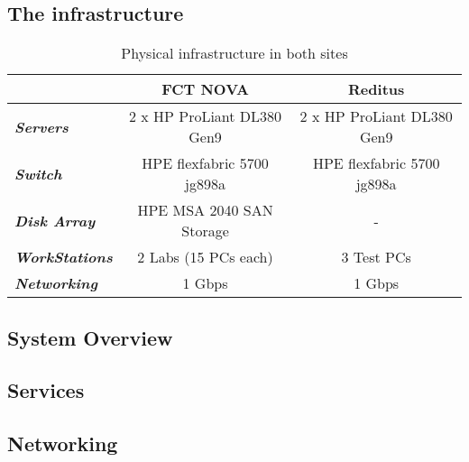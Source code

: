 \subsection{The infrastructure}
\label{sub:infrastructure}


\begin{table}[htpb]
\centering
\begin{tabular}{lcc}
\hline
                               & \textbf{FCT NOVA}          & \textbf{Reditus}           \\ \hline
\textit{\textbf{Servers}}      & 2 x HP ProLiant DL380 Gen9 & 2 x HP ProLiant DL380 Gen9 \\
\textit{\textbf{Switch}}       & HPE flexfabric 5700 jg898a & HPE flexfabric 5700 jg898a \\
\textit{\textbf{Disk Array}}   & HPE MSA 2040 SAN Storage   & -                          \\
\textit{\textbf{WorkStations}} & 2 Labs (15 PCs each)       & 3 Test PCs                 \\
\textit{\textbf{Networking}}   & 1 Gbps                     & 1 Gbps                     \\ \hline
\end{tabular}
\caption{Physical infrastructure in both sites}
\end{table}


\subsection{System Overview}
\label{sub:system_overview}

\subsection{Services}
\label{sub:cache_services}


\subsection{Networking}
\label{sub:cache_networking}

